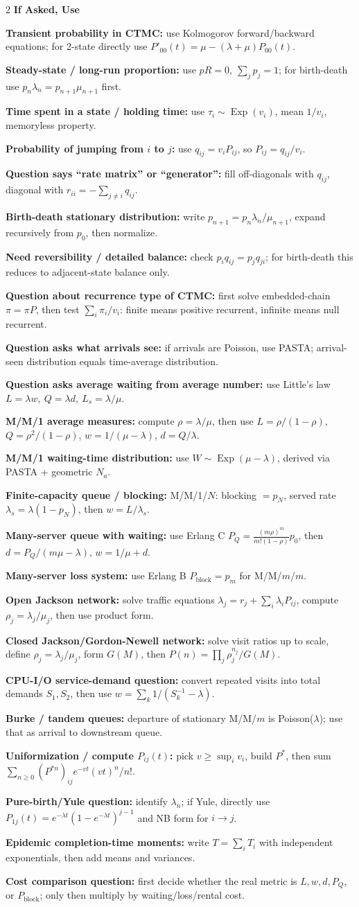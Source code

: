 \documentclass[10pt,fleqn]{article}
\newcommand{\shead}[1]{\vspace{0.05ex}\textbf{\scriptsize #1}\par}
\newcommand{\qa}[2]{\textbf{#1} #2\par}
\DeclareMathOperator{\Exp}{Exp}
\begin{document}
\begin{multicols*}{2}
\shead{If Asked, Use}
\qa{Transient probability in CTMC:}{use Kolmogorov forward/backward equations; for 2-state directly use \(P'_{00}(t)=\mu-(\lambda+\mu)P_{00}(t)\).}
\qa{Steady-state / long-run proportion:}{use \(pR=0,\ \sum_jp_j=1\); for birth-death use \(p_n\lambda_n=p_{n+1}\mu_{n+1}\) first.}
\qa{Time spent in a state / holding time:}{use \(\tau_i\sim\Exp(v_i)\), mean \(1/v_i\), memoryless property.}
\qa{Probability of jumping from \(i\) to \(j\):}{use \(q_{ij}=v_iP_{ij}\), so \(P_{ij}=q_{ij}/v_i\).}
\qa{Question says ``rate matrix'' or ``generator'':}{fill off-diagonals with \(q_{ij}\), diagonal with \(r_{ii}=-\sum_{j\ne i}q_{ij}\).}
\qa{Birth-death stationary distribution:}{write \(p_{n+1}=p_n\lambda_n/\mu_{n+1}\), expand recursively from \(p_0\), then normalize.}
\qa{Need reversibility / detailed balance:}{check \(p_iq_{ij}=p_jq_{ji}\); for birth-death this reduces to adjacent-state balance only.}
\qa{Question about recurrence type of CTMC:}{first solve embedded-chain \(\pi=\pi P\), then test \(\sum_i\pi_i/v_i\): finite means positive recurrent, infinite means null recurrent.}
\qa{Question asks what arrivals see:}{if arrivals are Poisson, use PASTA; arrival-seen distribution equals time-average distribution.}
\qa{Question asks average waiting from average number:}{use Little's law \(L=\lambda w,\ Q=\lambda d,\ L_s=\lambda/\mu\).}
\qa{M/M/1 average measures:}{compute \(\rho=\lambda/\mu\), then use \(L=\rho/(1-\rho)\), \(Q=\rho^2/(1-\rho)\), \(w=1/(\mu-\lambda)\), \(d=Q/\lambda\).}
\qa{M/M/1 waiting-time distribution:}{use \(W\sim\Exp(\mu-\lambda)\), derived via PASTA + geometric \(N_a\).}
\qa{Finite-capacity queue / blocking:}{M/M/1/\(N\): blocking \(=p_N\), served rate \(\lambda_s=\lambda(1-p_N)\), then \(w=L/\lambda_s\).}
\qa{Many-server queue with waiting:}{use Erlang C \(P_Q=\frac{(m\rho)^m}{m!(1-\rho)}p_0\), then \(d=P_Q/(m\mu-\lambda)\), \(w=1/\mu+d\).}
\qa{Many-server loss system:}{use Erlang B \(P_{\text{block}}=p_m\) for M/M/\(m\)/\(m\).}
\qa{Open Jackson network:}{solve traffic equations \(\lambda_j=r_j+\sum_i\lambda_iP_{ij}\), compute \(\rho_j=\lambda_j/\mu_j\), then use product form.}
\qa{Closed Jackson/Gordon-Newell network:}{solve visit ratios up to scale, define \(\rho_j=\lambda_j/\mu_j\), form \(G(M)\), then \(P(n)=\prod_j\rho_j^{n_j}/G(M)\).}
\qa{CPU-I/O service-demand question:}{convert repeated visits into total demands \(S_1,S_2\), then use \(w=\sum_k 1/(S_k^{-1}-\lambda)\).}
\qa{Burke / tandem queues:}{departure of stationary M/M/\(m\) is Poisson(\(\lambda\)); use that as arrival to downstream queue.}
\qa{Uniformization / compute \(P_{ij}(t)\):}{pick \(v\ge\sup_i v_i\), build \(P^*\), then sum \(\sum_{n\ge0}(P^{*n})_{ij}e^{-vt}(vt)^n/n!\).}
\qa{Pure-birth/Yule question:}{identify \(\lambda_n\); if Yule, directly use \(P_{1j}(t)=e^{-\lambda t}(1-e^{-\lambda t})^{j-1}\) and NB form for \(i\to j\).}
\qa{Epidemic completion-time moments:}{write \(T=\sum_iT_i\) with independent exponentials, then add means and variances.}
\qa{Cost comparison question:}{first decide whether the real metric is \(L,w,d,P_Q\), or \(P_{\text{block}}\); only then multiply by waiting/loss/rental cost.}


\end{multicols*}
\end{document}
